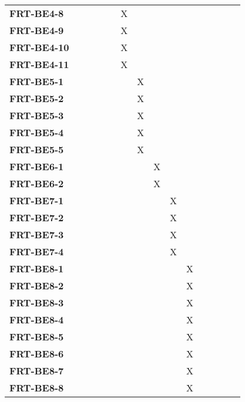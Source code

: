 \documentclass[12pt, titlepage]{article}
\begin{document}
\begin{table}[H]
\begin{adjustbox}{max width=0.7\paperwidth}
\begin{tabular}{l|ccccccccccc}
        \textbf{FRT-BE4-8}  & ~ & ~ & ~ & X & ~ & ~ & ~ & ~ & ~ & ~ & ~\\
        \textbf{FRT-BE4-9}  & ~ & ~ & ~ & X & ~ & ~ & ~ & ~ & ~ & ~ & ~\\
        \textbf{FRT-BE4-10} & ~ & ~ & ~ & X & ~ & ~ & ~ & ~ & ~ & ~ & ~\\
        \textbf{FRT-BE4-11} & ~ & ~ & ~ & X & ~ & ~ & ~ & ~ & ~ & ~ & ~\\
        \textbf{FRT-BE5-1}  & ~ & ~ & ~ & ~ & X & ~ & ~ & ~ & ~ & ~ & ~\\
        \textbf{FRT-BE5-2}  & ~ & ~ & ~ & ~ & X & ~ & ~ & ~ & ~ & ~ & ~\\
        \textbf{FRT-BE5-3}  & ~ & ~ & ~ & ~ & X & ~ & ~ & ~ & ~ & ~ & ~\\
        \textbf{FRT-BE5-4}  & ~ & ~ & ~ & ~ & X & ~ & ~ & ~ & ~ & ~ & ~\\
        \textbf{FRT-BE5-5}  & ~ & ~ & ~ & ~ & X & ~ & ~ & ~ & ~ & ~ & ~\\
        \textbf{FRT-BE6-1}  & ~ & ~ & ~ & ~ & ~ & X & ~ & ~ & ~ & ~ & ~\\
        \textbf{FRT-BE6-2}  & ~ & ~ & ~ & ~ & ~ & X & ~ & ~ & ~ & ~ & ~\\
        \textbf{FRT-BE7-1}  & ~ & ~ & ~ & ~ & ~ & ~ & X & ~ & ~ & ~ & ~\\
        \textbf{FRT-BE7-2}  & ~ & ~ & ~ & ~ & ~ & ~ & X & ~ & ~ & ~ & ~\\
        \textbf{FRT-BE7-3}  & ~ & ~ & ~ & ~ & ~ & ~ & X & ~ & ~ & ~ & ~\\
        \textbf{FRT-BE7-4}  & ~ & ~ & ~ & ~ & ~ & ~ & X & ~ & ~ & ~ & ~\\
        \textbf{FRT-BE8-1}  & ~ & ~ & ~ & ~ & ~ & ~ & ~ & X & ~ & ~ & ~\\
        \textbf{FRT-BE8-2}  & ~ & ~ & ~ & ~ & ~ & ~ & ~ & X & ~ & ~ & ~\\
        \textbf{FRT-BE8-3}  & ~ & ~ & ~ & ~ & ~ & ~ & ~ & X & ~ & ~ & ~\\
        \textbf{FRT-BE8-4}  & ~ & ~ & ~ & ~ & ~ & ~ & ~ & X & ~ & ~ & ~\\
        \textbf{FRT-BE8-5}  & ~ & ~ & ~ & ~ & ~ & ~ & ~ & X & ~ & ~ & ~\\
        \textbf{FRT-BE8-6}  & ~ & ~ & ~ & ~ & ~ & ~ & ~ & X & ~ & ~ & ~\\
        \textbf{FRT-BE8-7}  & ~ & ~ & ~ & ~ & ~ & ~ & ~ & X & ~ & ~ & ~\\
        \textbf{FRT-BE8-8}  & ~ & ~ & ~ & ~ & ~ & ~ & ~ & X & ~ & ~ & ~\\

\end{tabular}
\end{adjustbox}
\end{table}
\end{document}
